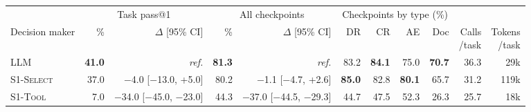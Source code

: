 \begin{tabular}{@{}lrrrrrrrrrr@{}}\toprule
& \multicolumn{2}{c}{Task pass@1} & \multicolumn{2}{c}{All checkpoints} & \multicolumn{4}{c}{Checkpoints by type (\%)} & & \\
\cmidrule(lr){2-3}\cmidrule(lr){4-5}\cmidrule(lr){6-9}
Decision maker & \% & $\Delta$ [95\% CI] & \% & $\Delta$ [95\% CI] & DR & CR & AE & Doc & \shortstack{Calls\\/task} & \shortstack{Tokens\\/task} \\\midrule
\textsc{LLM} & \textbf{41.0} & \textit{ref.} & \textbf{81.3} & \textit{ref.} & 83.2 & \textbf{84.1} & 75.0 & \textbf{70.7} & 36.3 & 29k \\
\textsc{S1-Select} & 37.0 & $-$4.0 [$-$13.0, +5.0] & 80.2 & $-$1.1 [$-$4.7, +2.6] & \textbf{85.0} & 82.8 & \textbf{80.1} & 65.7 & 31.2 & 119k \\
\textsc{S1-Tool} & 7.0 & $-$34.0 [$-$45.0, $-$23.0] & 44.3 & $-$37.0 [$-$44.5, $-$29.3] & 44.7 & 47.5 & 52.3 & 26.3 & 25.7 & 18k \\
\bottomrule\end{tabular}
